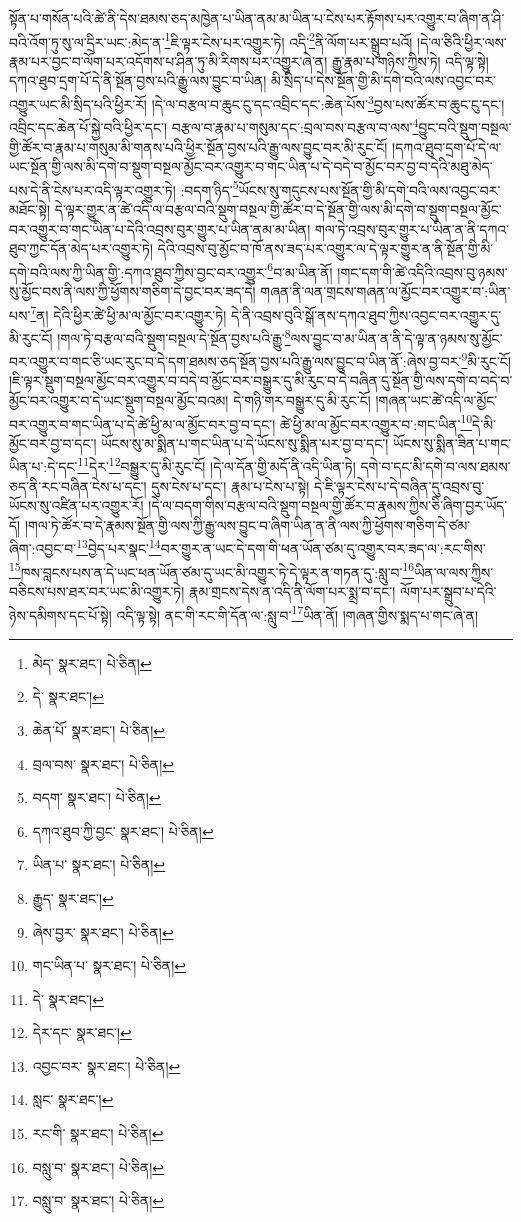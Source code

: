 སྟོན་པ་གསོན་པའི་ཚེ་ནི་དེས་ཐམས་ཅད་མཁྱེན་པ་ཡིན་ནམ་མ་ཡིན་པ་ངེས་པར་རྟོགས་པར་འགྱུར་བ་ཞིག་ན་ཤི་བའི་འོག་ཏུ་སུ་ལ་དྲིར་ཡང་:མེད་ན་\footnote{མེད་  སྣར་ཐང་།  པེ་ཅིན། }ཇི་ལྟར་ངེས་པར་འགྱུར་ཏེ། འདི་\footnote{དེ་  སྣར་ཐང་། }ནི་ལོག་པར་སྒྲུབ་པའོ། །དེ་ལ་ཅིའི་ཕྱིར་ལས་རྣམ་པར་བྱང་བ་ལོག་པར་འདོགས་པ་ཤིན་ཏུ་མི་རིགས་པར་འགྱུར་ཞེ་ན། རྒྱུ་རྣམ་པ་གཉིས་ཀྱིས་ཏེ། འདི་ལྟ་སྟེ། དཀའ་ཐུབ་དྲག་པོ་དེ་ནི་སྔོན་བྱས་པའི་རྒྱུ་ལས་བྱུང་བ་ཡིན། མི་སྲིད་པ་དེས་སྔོན་གྱི་མི་དགེ་བའི་ལས་འབྱང་བར་འགྱུར་ཡང་མི་སྲིད་པའི་ཕྱིར་རོ། །དེ་ལ་བརྩལ་བ་ཆུང་ངུ་དང་འབྲིང་དང་:ཆེན་པོས་\footnote{ཆེན་པོ་  སྣར་ཐང་།  པེ་ཅིན། }བྱས་པས་ཚོར་བ་ཆུང་ངུ་དང་། འབྲིང་དང་ཆེན་པོ་སྐྱེ་བའི་ཕྱིར་དང་། བརྩལ་བ་རྣམ་པ་གསུམ་དང་:བྲལ་བས་བརྩལ་བ་ལས་\footnote{བྲལ་བས་  སྣར་ཐང་།  པེ་ཅིན། }བྱུང་བའི་སྡུག་བསྔལ་གྱི་ཚོར་བ་རྣམ་པ་གསུམ་མི་གནས་པའི་ཕྱིར་སྔོན་བྱས་པའི་རྒྱུ་ལས་བྱུང་བར་མི་རུང་ངོ། །དཀའ་ཐུབ་དྲག་པོ་དེ་ལ་ཡང་སྔོན་གྱི་ལས་མི་དགེ་བ་སྡུག་བསྔལ་མྱོང་བར་འགྱུར་བ་གང་ཡིན་པ་དེ་བདེ་བ་མྱོང་བར་བྱ་བ་དེའི་མཐུ་མེད་པས་དེ་ནི་ངེས་པར་འདི་ལྟར་འགྱུར་ཏེ། :བདག་ཉིད་\footnote{བདག་  སྣར་ཐང་།  པེ་ཅིན། }ཡོངས་སུ་གདུངས་པས་སྔོན་གྱི་མི་དགེ་བའི་ལས་འབྱང་བར་མཐོང་སྟེ། དེ་ལྟར་གྱུར་ན་ཚེ་འདི་ལ་བརྩལ་བའི་སྡུག་བསྔལ་གྱི་ཚོར་བ་དེ་སྔོན་གྱི་ལས་མི་དགེ་བ་སྡུག་བསྔལ་མྱོང་བར་འགྱུར་བ་གང་ཡིན་པ་དེའི་འབྲས་བུར་གྱུར་པ་ཡིན་ནམ་མ་ཡིན། གལ་ཏེ་འབྲས་བུར་གྱུར་པ་ཡིན་ན་ནི་དཀའ་ཐུབ་ཀྱང་དོན་མེད་པར་འགྱུར་ཏེ། དེའི་འབྲས་བུ་མྱོང་བ་ཁོ་ནས་ཟད་པར་འགྱུར་ལ་དེ་ལྟར་གྱུར་ན་ནི་སྔོན་གྱི་མི་དགེ་བའི་ལས་ཀྱི་ཡིན་གྱི་:དཀའ་ཐུབ་ཀྱིས་བྱང་བར་འགྱུར་\footnote{དཀའ་ཐུབ་ཀྱི་བྱང་  སྣར་ཐང་།  པེ་ཅིན། }བ་མ་ཡིན་ནོ། །གང་དག་གི་ཚེ་འདིའི་འབྲས་བུ་ཉམས་སུ་མྱོང་བས་ནི་ལས་ཀྱི་ཕྱོགས་གཅིག་དེ་བྱང་བར་ཟད་དེ། གཞན་ནི་ལན་གྲངས་གཞན་ལ་མྱོང་བར་འགྱུར་བ་:ཡིན་པས་\footnote{ཡིན་པ་  སྣར་ཐང་།  པེ་ཅིན། }ན། དེའི་ཕྱིར་ཚེ་ཕྱི་མ་ལ་མྱོང་བར་འགྱུར་ཏེ། དེ་ནི་འབྲས་བུའི་སྒོ་ནས་དཀའ་ཐུབ་ཀྱིས་འབྱང་བར་འགྱུར་དུ་མི་རུང་ངོ། །གལ་ཏེ་བརྩལ་བའི་སྡུག་བསྔལ་དེ་སྔོན་བྱས་པའི་རྒྱུ་\footnote{རྒྱུད་  སྣར་ཐང་། }ལས་བྱུང་བ་མ་ཡིན་ན་ནི་དེ་ལྟ་ན་ཉམས་སུ་མྱོང་བར་འགྱུར་བ་གང་ཅི་ཡང་རུང་བ་དེ་དག་ཐམས་ཅད་སྔོན་བྱས་པའི་རྒྱུ་ལས་བྱུང་བ་ཡིན་ནོ་:ཞེས་བྱ་བར་\footnote{ཞེས་བྱར་  སྣར་ཐང་།  པེ་ཅིན། }མི་རུང་ངོ། །ཇི་ལྟར་སྡུག་བསྔལ་མྱོང་བར་འགྱུར་བ་བདེ་བ་མྱོང་བར་བསྒྱུར་དུ་མི་རུང་བ་དེ་བཞིན་དུ་སྔོན་གྱི་ལས་དགེ་བ་བདེ་བ་མྱོང་བར་འགྱུར་བ་དེ་ཡང་སྡུག་བསྔལ་མྱོང་བའམ། དེ་གཉི་གར་བསྒྱུར་དུ་མི་རུང་ངོ། །གཞན་ཡང་ཚེ་འདི་ལ་མྱོང་བར་འགྱུར་བ་གང་ཡིན་པ་དེ་ཚེ་ཕྱི་མ་ལ་མྱོང་བར་བྱ་བ་དང་། ཚེ་ཕྱི་མ་ལ་མྱོང་བར་འགྱུར་བ་:གང་ཡིན་\footnote{གང་ཡིན་པ་  སྣར་ཐང་།  པེ་ཅིན། }དེ་མི་མྱོང་བར་བྱ་བ་དང་། ཡོངས་སུ་མ་སྨིན་པ་གང་ཡིན་པ་དེ་ཡོངས་སུ་སྨིན་པར་བྱ་བ་དང་། ཡོངས་སུ་སྨིན་ཟིན་པ་གང་ཡིན་པ་:དེ་དང་\footnote{དེ་  སྣར་ཐང་། }དེར་\footnote{དེར་དང་  སྣར་ཐང་། }བསྒྱུར་དུ་མི་རུང་ངོ། །དེ་ལ་དོན་གྱི་མདོ་ནི་འདི་ཡིན་ཏེ། དགེ་བ་དང་མི་དགེ་བ་ལས་ཐམས་ཅད་ནི་རང་བཞིན་ངེས་པ་དང་། དུས་ངེས་པ་དང་། རྣམ་པ་ངེས་པ་སྟེ། དེ་ཇི་ལྟར་ངེས་པ་དེ་བཞིན་དུ་འབྲས་བུ་ཡོངས་སུ་འཛིན་པར་འགྱུར་རོ། །དེ་ལ་བདག་གིས་བརྩལ་བའི་སྡུག་བསྔལ་གྱི་ཚོར་བ་རྣམས་ཀྱིས་ཅི་ཞིག་བྱར་ཡོད་དོ། །གལ་ཏེ་ཚོར་བ་དེ་རྣམས་སྔོན་གྱི་ལས་ཀྱི་རྒྱུ་ལས་བྱུང་བ་ཞིག་ཡིན་ན་ནི་ལས་ཀྱི་ཕྱོགས་གཅིག་དེ་ཙམ་ཞིག་:འབྱང་བ་\footnote{འབྱང་བར་  སྣར་ཐང་།  པེ་ཅིན། }བྱེད་པར་སྣང་\footnote{སླང་  སྣར་ཐང་། }བར་གྱུར་ན་ཡང་དེ་དག་གི་ཕན་ཡོན་ཙམ་དུ་འགྱུར་བར་ཟད་ལ་:རང་གིས་\footnote{རང་གི་  སྣར་ཐང་།  པེ་ཅིན། }ཁས་བླངས་པས་ན་དེ་ཡང་ཕན་ཡོན་ཙམ་དུ་ཡང་མི་འགྱུར་ཏེ་དེ་ལྟར་ན་གཏན་དུ་:སླུ་བ་\footnote{བསླུ་བ་  སྣར་ཐང་།  པེ་ཅིན། }ཡིན་ལ་ལས་ཀྱིས་བཅིངས་པས་ཐར་བར་ཡང་མི་འགྱུར་ཏེ། རྣམ་གྲངས་དེས་ན་འདི་ནི་ལོག་པར་སྨྲ་བ་དང་། ལོག་པར་སྒྲུབ་པ་དེའི་ཉེས་དམིགས་དང་པོ་སྟེ། འདི་ལྟ་སྟེ། ནང་གི་རང་གི་དོན་ལ་:སླུ་བ་\footnote{བསླུ་བ་  སྣར་ཐང་།  པེ་ཅིན། }ཡིན་ནོ། །གཞན་གྱིས་སྨད་པ་གང་ཞེ་ན། 